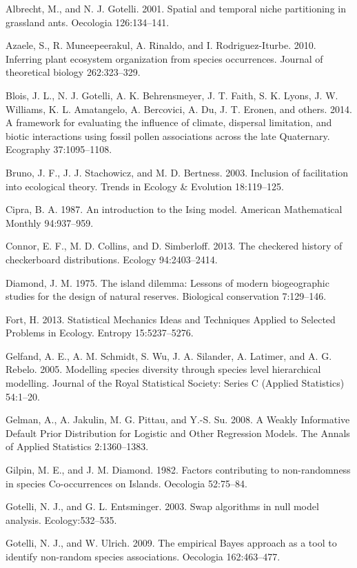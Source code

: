 \documentclass[12pt,]{article}
\begin{document}
\begin{spacing}{1.9}
\begin{flushleft}
Albrecht, M., and N. J. Gotelli. 2001. Spatial and temporal niche
partitioning in grassland ants. Oecologia 126:134--141.

Azaele, S., R. Muneepeerakul, A. Rinaldo, and I. Rodriguez-Iturbe. 2010.
Inferring plant ecosystem organization from species occurrences. Journal
of theoretical biology 262:323--329.

Blois, J. L., N. J. Gotelli, A. K. Behrensmeyer, J. T. Faith, S. K.
Lyons, J. W. Williams, K. L. Amatangelo, A. Bercovici, A. Du, J. T.
Eronen, and others. 2014. A framework for evaluating the influence of
climate, dispersal limitation, and biotic interactions using fossil
pollen associations across the late Quaternary. Ecography 37:1095--1108.

Bruno, J. F., J. J. Stachowicz, and M. D. Bertness. 2003. Inclusion of
facilitation into ecological theory. Trends in Ecology \& Evolution
18:119--125.

Cipra, B. A. 1987. An introduction to the Ising model. American
Mathematical Monthly 94:937--959.

Connor, E. F., M. D. Collins, and D. Simberloff. 2013. The checkered
history of checkerboard distributions. Ecology 94:2403--2414.

Diamond, J. M. 1975. The island dilemma: Lessons of modern biogeographic
studies for the design of natural reserves. Biological conservation
7:129--146.

Fort, H. 2013. Statistical Mechanics Ideas and Techniques Applied to
Selected Problems in Ecology. Entropy 15:5237--5276.

Gelfand, A. E., A. M. Schmidt, S. Wu, J. A. Silander, A. Latimer, and A.
G. Rebelo. 2005. Modelling species diversity through species level
hierarchical modelling. Journal of the Royal Statistical Society: Series
C (Applied Statistics) 54:1--20.

Gelman, A., A. Jakulin, M. G. Pittau, and Y.-S. Su. 2008. A Weakly
Informative Default Prior Distribution for Logistic and Other Regression
Models. The Annals of Applied Statistics 2:1360--1383.

Gilpin, M. E., and J. M. Diamond. 1982. Factors contributing to
non-randomness in species Co-occurrences on Islands. Oecologia
52:75--84.

Gotelli, N. J., and G. L. Entsminger. 2003. Swap algorithms in null
model analysis. Ecology:532--535.

Gotelli, N. J., and W. Ulrich. 2009. The empirical Bayes approach as a
tool to identify non-random species associations. Oecologia
162:463--477.


\end{flushleft}
\end{spacing}
\end{document}
